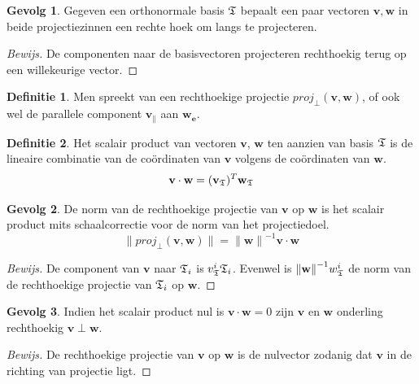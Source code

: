 \documentclass{amsart}
\theoremstyle{definition}
\newtheorem{dfn}{Definitie}[section]
\newtheorem{csq}{Gevolg}[section]
\newenvironment{bewijs}{\begin{proof}[Bewijs]}{\end{proof}}
\newcommand{\norm}[1]{\lVert{#1}\rVert}
\newcommand{\vvec}[1][v]{\mathbf{#1}}
\newcommand{\uvec}[1][v]{\vvec[#1]_\mathbf{e}}
\newcommand{\vnorm}[1]{\norm{\vvec[#1]}}
\newcommand{\vecrow}[1][a]{\mathfrak{\MakeUppercase{#1}}}
\newcommand{\rvec}[2][i]{{#2}_{#1}}
\newcommand{\rvecr}[2][i]{\rvec[#1]{\vecrow[#2]}}
\newcommand{\cvec}[2]{{#1}_{#2}}
\newcommand{\cvecv}[2][v]{\cvec{\vvec[#1]}{#2}}
\newcommand{\cvecva}[1][a]{\cvecv{\vecrow[#1]}}
\newcommand{\cvecc}[2][a]{\cvecv[#2]{\vecrow[#1]}}
\newcommand{\vcord}[3]{{#1}^{#2}_{#3}}
\newcommand{\vcordv}[3][v]{\vcord{#1}{#2}{\vecrow[#3]}}
\newcommand{\vcordvi}[2][i]{\vcordv{#1}{#2}}
\begin{document}
\begin{csq}
    Gegeven een orthonormale basis $\vecrow[t]$ bepaalt een paar vectoren $\vvec, \vvec[w]$ in beide projectiezinnen een rechte hoek om langs te projecteren.
    \begin{bewijs}
        De componenten naar de basisvectoren projecteren rechthoekig terug op een willekeurige vector.
    \end{bewijs}
\end{csq}

\begin{dfn}
    Men spreekt van een rechthoekige projectie $proj_\perp(\vvec, \vvec[w])$, of ook wel de parallele component $\vvec_\|$ aan $\uvec[w]$.
\end{dfn}

\begin{dfn}
    Het scalair product van vectoren $\vvec$, $\vvec[w]$ ten aanzien van basis $\vecrow[t]$ is de lineaire combinatie van de coördinaten van $\vvec$ volgens de coördinaten van $\vvec[w]$.
    \begin{equation*}
        \vvec \cdot \vvec[w] = (\cvecva[t])^T \cvecc[t]{w}
    \end{equation*}
\end{dfn}

\begin{csq}
    De norm van de rechthoekige projectie van $\vvec$ op $\vvec[w]$ is het scalair product mits schaalcorrectie voor de norm van het projectiedoel.
    \begin{equation*}
        \norm{proj_\perp(\vvec, \vvec[w])} = {\vnorm w}^{-1}\vvec \cdot \vvec[w]
    \end{equation*}
    \begin{bewijs}
        De component van $\vvec$ naar $\rvecr{t}$ is $\vcordvi{t}\rvecr{t}$. Evenwel is ${\vnorm w}^{-1}\vcordv[w]{i}{t}$ de norm van de rechthoekige projectie van $\rvecr{t}$ op $\vvec[w]$.
    \end{bewijs}
\end{csq}

\begin{csq}
    Indien het scalair product nul is $\vvec \cdot\vvec[w] = 0$ zijn $\vvec$ en $\vvec[w]$ onderling rechthoekig $\vvec\perp\vvec[w]$.
    \begin{bewijs}
        De rechthoekige projectie van $\vvec$ op $\vvec[w]$ is de nulvector zodanig dat $\vvec$ in de richting van projectie ligt.
    \end{bewijs}
\end{csq}
\end{document}
